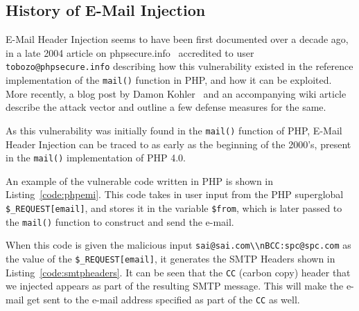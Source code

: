 \subsection{History of E-Mail Injection}

E-Mail Header Injection seems to have been first documented over a decade ago, in a late 2004 article on phpsecure.info~\cite{Tobozo} accredited to user \lstinline|tobozo@phpsecure.info| describing how this vulnerability existed in the reference implementation of the \texttt{mail()} function in PHP, and how it can be exploited. More recently, a blog post by Damon Kohler~\cite{DK} and an accompanying wiki article~\cite{Injection} describe the attack vector and outline a few defense measures for the same.

As this vulnerability was initially found in the \texttt{mail()} function of PHP, E-Mail Header Injection can be traced to as early as the beginning of the 2000's, present in the \texttt{mail()} implementation of PHP 4.0. 

An example of the vulnerable code written in PHP is shown in Listing~\ref{code:phpemi}. This code takes in user input from the PHP superglobal \texttt{\$\_REQUEST[\textquotesingle email\textquotesingle]}, and stores it in the variable \texttt{\$from}, which is later passed to the \texttt{mail()} function to construct and send the e-mail.

	
When this code is given the malicious input \texttt{\lstinline{sai@sai.com\\nBCC:spc@spc.com}} as the value of the \texttt{\$\_REQUEST[\textquotesingle email\textquotesingle]}, it generates the SMTP Headers shown in Listing~\ref{code:smtpheaders}. It can be seen that the \texttt{CC} (carbon copy) header that we injected appears as part of the resulting SMTP message. This will make the e-mail get sent to the e-mail address specified as part of the \texttt{CC} as well.

%
